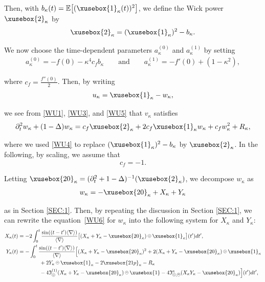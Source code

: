\documentclass[%
11pt,  reqno]{amsart}
\def\<#1>{\xusebox{#1}}
\newcommand{\pe}{\mathbin{\scaleobj{0.7}{\tikz \draw (0,0) node[shape=circle,draw,inner sep=0pt,minimum size=8.5pt] {\scriptsize  $=$};}}}
\newcommand{\pl}{\mathbin{\scaleobj{0.7}{\tikz \draw (0,0) node[shape=circle,draw,inner sep=0pt,minimum size=8.5pt] {\scriptsize $<$};}}}
\newcommand{\pg}{\mathbin{\scaleobj{0.7}{\tikz \draw (0,0) node[shape=circle,draw,inner sep=0pt,minimum size=8.5pt] {\scriptsize $>$};}}}
\newcommand{\1}{\hspace{0.2mm}\text{I}\hspace{0.2mm}}
\newcommand{\noi}{\noindent}
\newcommand{\E}{\mathbb{E}}
\newcommand{\nb}{\nabla}
\newcommand{\Dl}{\Delta}
\newcommand{\kk}{\kappa}
\newcommand{\dt}{\partial_t}
\newcommand{\jb}[1]
{\langle #1 \rangle}
\newcommand{\If}{\mathfrak{I}}
\numberwithin{equation}{section}
\numberwithin{theorem}{section}
\begin{document}
\noi
Then, with  $b_\kk(t) = \E\big[(\<1>_\kk(t))^2\big]$, 
we define the Wick power $\<2>_\kk$ by 
\begin{align}
 \<2>_\kk = (\<1>_\kk)^2 - b_{\kk}.
\label{WU4}
\end{align}


\noi
We now choose the time-dependent parameters $a_\kk^{(0)}$ and $a_\kk^{(1)}$ 
by setting
\begin{align}
\label{WU5}
 a^{(0)}_{\kk} = - f (0) -  \kk^4 c_f b_{\kk}
 \qquad\text{and}\qquad
a^{(1)}_{\kk} = - f' (0) + (1 - \kk^2), 
\end{align}

\noi
where $c_f =  \frac{f'' (0)}{2}$.
Then, by writing
\begin{align*}
u_{\kk} =  \<1>_\kk -  w_{\kk}, 
\end{align*}

\noi
we see from \eqref{WU1}, \eqref{WU3}, and \eqref{WU5} that $v_\kk$ satisfies
\begin{align}
 \partial_t^2 w_{\kk}  + (1 - \Dl) w_{\kk} 
= c_f \<2>_\kk + 2c_f  \<1>_{\kk}  w_{\kk} +
 c_f  w_{\kk}^2 + R_{\kk}, 
\label{WU6}
\end{align}

\noi
where we used \eqref{WU4}
to replace $(\<1>_\kk)^2 - b_{\kk}$ by $ \<2>_\kk$.
In the following, by scaling, 
we assume that 
\[c_f = -1.\]



Letting $\<20>_\kk = (\dt^2 + 1 - \Dl)^{-1} (\<2>_\kk)$, 
we decompose $w_\kk$ as 
\begin{align*}
w_\kk = - \<20>_\kk + X_\kk + Y_\kk
\end{align*}

\noi
as in Section \ref{SEC:1}.
Then, by repeating the discussion in Section \ref{SEC:1}, 
we can rewrite the equation~\eqref{WU6} for $w_\kk$
into the following system for $X_\kk$ and $Y_\kk$:
\begin{align}
\begin{split}
 X_\kk (t)  &  =  -2 \int_0^t \frac{\sin((t-t')\jb{\nb})}{\jb{\nb}} 
 \big[(X_\kk+ Y_\kk - \<20>_\kk)\pl \<1>_\kk\big](t')dt',  \\
Y_\kk  (t) &   = 
- 
 \int_0^t \frac{\sin((t-t')\jb{\nb})}{\jb{\nb}} 
\Big[(X_\kk+Y_\kk-\<20>_\kk)^2 +  2(X_\kk + Y_\kk - \<20>_\kk)\pg \<1>_\kk\\
& \hspace{4em} 
+ 2 Y_\kk \pe \<1>_\kk - 2 \<21p>_\kk
  -R_\kk \\%
& \hspace{4em}
 -4 \If_{\pl}^{(1)}(X_\kk+  Y_\kk - \<20>_\kk)\pe \<1> 
 -4\If_{\pl, \pe}^\kk(X_\kk Y_\kk - \<20>_\kk)\Big] (t') dt', 
\end{split}
 \label{SNLW8-wu}
\end{align}
\end{document}
